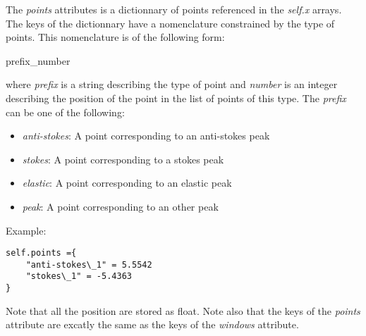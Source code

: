 The \textit{points} attributes is a dictionnary of points referenced in the \textit{self.x} arrays. The keys of the dictionnary have a nomenclature constrained by the type of points. This nomenclature is of the following form:
\begin{center}
    prefix\_number
\end{center}
where \textit{prefix} is a string describing the type of point and \textit{number} is an integer describing the position of the point in the list of points of this type. The \textit{prefix} can be one of the following:
\begin{itemize}
    \item \textit{anti-stokes}: A point corresponding to an anti-stokes peak
    \item \textit{stokes}: A point corresponding to a stokes peak
    \item \textit{elastic}: A point corresponding to an elastic peak
    \item \textit{peak}: A point corresponding to an other peak
\end{itemize}

Example:
\begin{lstlisting}
self.points ={
    "anti-stokes\_1" = 5.5542
    "stokes\_1" = -5.4363
}
\end{lstlisting}

Note that all the position are stored as float. Note also that the keys of the \textit{points} attribute are excatly the same as the keys of the \textit{windows} attribute.
